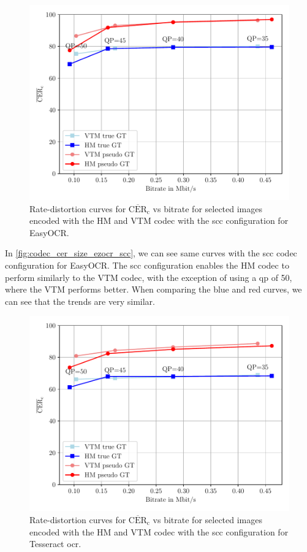 \begin{figure}[h!]
    \centering
    \includegraphics[width=\textwidth]{../images/analyze/codec_cer_size_ezocr_scc.pdf}
    \caption{Rate-distortion curves for $\overline{\text{CER}}_{\text{c}}$ vs bitrate for selected images encoded with the HM and VTM codec with the \gls{scc} configuration for EasyOCR.}
    \label{fig:codec_cer_size_ezocr_scc}
\end{figure}

In \autoref{fig:codec_cer_size_ezocr_scc}, we can see same curves with the \gls{scc} codec configuration for EasyOCR.
The \gls{scc} configuration enables the HM codec to perform similarly to the VTM codec, with the exception of using a \gls{qp} of 50, where the VTM performs better.
When comparing the blue and red curves, we can see that the trends are very similar.


\begin{figure}[h!]
    \centering
    \includegraphics[width=\textwidth]{../images/analyze/codec_cer_size_tess_scc.pdf}
    \caption{Rate-distortion curves for $\overline{\text{CER}}_{\text{c}}$ vs bitrate for selected images encoded with the HM and VTM codec with the \gls{scc} configuration for Tesseract \gls{ocr}.}
    \label{fig:codec_cer_size_tess_scc}
\end{figure}

